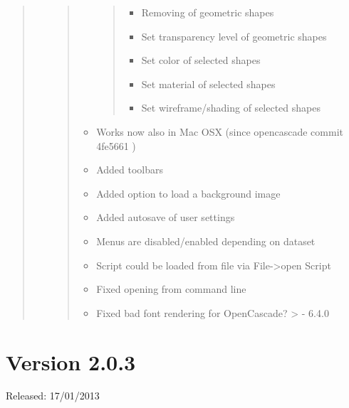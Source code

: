 \documentclass[]{scrartcl}
\begin{document}
\begin{quote}
\begin{itemize}
\begin{quote}
\begin{itemize}
    \begin{quote}
    \begin{itemize}
    \itemsep1pt\parskip0pt
    \item
      Removing of geometric shapes
    \item
      Set transparency level of geometric shapes
    \item
      Set color of selected shapes
    \item
      Set material of selected shapes
    \item
      Set wireframe/shading of selected shapes
    \end{itemize}
    \end{quote}
  \item
    Works now also in Mac OSX (since opencascade commit 4fe5661 )
  \item
    Added toolbars
  \item
    Added option to load a background image
  \item
    Added autosave of user settings
  \item
    Menus are disabled/enabled depending on dataset
  \item
    Script could be loaded from file via File-\textgreater{}open Script
  \item
    Fixed opening from command line
  \item
    Fixed bad font rendering for OpenCascade? \textgreater{} - 6.4.0
  \end{itemize}
  \end{quote}
\end{itemize}
\end{quote}

\section{Version 2.0.3}\label{version-2.0.3}

Released: 17/01/2013
\end{document}
